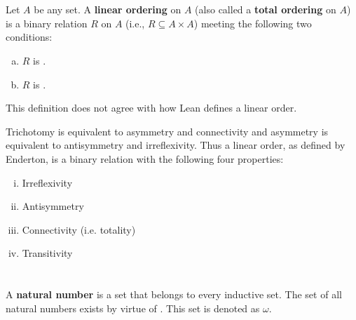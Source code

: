\documentclass{report}
\begin{document}
\section{}

Let $A$ be any set.
A \textbf{linear ordering} on $A$ (also called a \textbf{total ordering} on $A$)
  is a binary relation $R$ on $A$ (i.e., $R \subseteq A \times A$) meeting the
  following two conditions:

\begin{enumerate}[(a)]
  \item $R$ is .
  \item $R$ is .
\end{enumerate}

\begin{note}
  This definition does not agree with how Lean defines a linear order.

  \vspace{6pt}
  Trichotomy is equivalent to asymmetry and connectivity and asymmetry is
    equivalent to antisymmetry and irreflexivity.
  Thus a linear order, as defined by Enderton, is a binary relation with the
    following four properties:

  \vspace{6pt}
  \begin{enumerate}[(i)]
    \item Irreflexivity
    \item Antisymmetry
    \item Connectivity (i.e. totality)
    \item Transitivity
  \end{enumerate}
\end{note}

\begin{definition}


\end{definition}

\section{}%

A \textbf{natural number} is a set that belongs to every inductive set.
The set of all natural numbers exists by virtue of .
This set is denoted as $\omega$.
\end{document}
